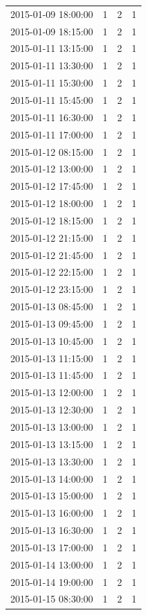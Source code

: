 \begin{tabular}{lrrr}
2015-01-09 18:00:00 & 1 & 2 & 1 \\
2015-01-09 18:15:00 & 1 & 2 & 1 \\
2015-01-11 13:15:00 & 1 & 2 & 1 \\
2015-01-11 13:30:00 & 1 & 2 & 1 \\
2015-01-11 15:30:00 & 1 & 2 & 1 \\
2015-01-11 15:45:00 & 1 & 2 & 1 \\
2015-01-11 16:30:00 & 1 & 2 & 1 \\
2015-01-11 17:00:00 & 1 & 2 & 1 \\
2015-01-12 08:15:00 & 1 & 2 & 1 \\
2015-01-12 13:00:00 & 1 & 2 & 1 \\
2015-01-12 17:45:00 & 1 & 2 & 1 \\
2015-01-12 18:00:00 & 1 & 2 & 1 \\
2015-01-12 18:15:00 & 1 & 2 & 1 \\
2015-01-12 21:15:00 & 1 & 2 & 1 \\
2015-01-12 21:45:00 & 1 & 2 & 1 \\
2015-01-12 22:15:00 & 1 & 2 & 1 \\
2015-01-12 23:15:00 & 1 & 2 & 1 \\
2015-01-13 08:45:00 & 1 & 2 & 1 \\
2015-01-13 09:45:00 & 1 & 2 & 1 \\
2015-01-13 10:45:00 & 1 & 2 & 1 \\
2015-01-13 11:15:00 & 1 & 2 & 1 \\
2015-01-13 11:45:00 & 1 & 2 & 1 \\
2015-01-13 12:00:00 & 1 & 2 & 1 \\
2015-01-13 12:30:00 & 1 & 2 & 1 \\
2015-01-13 13:00:00 & 1 & 2 & 1 \\
2015-01-13 13:15:00 & 1 & 2 & 1 \\
2015-01-13 13:30:00 & 1 & 2 & 1 \\
2015-01-13 14:00:00 & 1 & 2 & 1 \\
2015-01-13 15:00:00 & 1 & 2 & 1 \\
2015-01-13 16:00:00 & 1 & 2 & 1 \\
2015-01-13 16:30:00 & 1 & 2 & 1 \\
2015-01-13 17:00:00 & 1 & 2 & 1 \\
2015-01-14 13:00:00 & 1 & 2 & 1 \\
2015-01-14 19:00:00 & 1 & 2 & 1 \\
2015-01-15 08:30:00 & 1 & 2 & 1 \\

\end{tabular}
